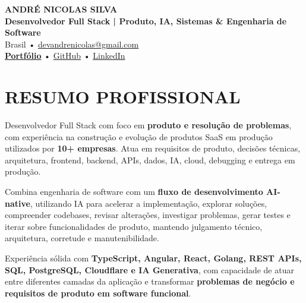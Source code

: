 \documentclass[10pt,a4paper]{article}
\begin{document}

\begin{center}

    {\LARGE \textbf{ANDRÉ NICOLAS SILVA}} \\[-2pt]

    {\normalsize \textbf{Desenvolvedor Full Stack | Produto, IA, Sistemas \& Engenharia de Software}} \\[1pt]

    \footnotesize
    Brasil \quad • \quad
    \href{mailto:devandrenicolas@gmail.com}{devandrenicolas@gmail.com} \\[-1pt]

    \textbf{\href{https://portfolio-andrenicolas.vercel.app}{Portfólio}}
    \quad • \quad
    \href{https://github.com/devAndreNicolas}{GitHub}
    \quad • \quad
    \href{https://www.linkedin.com/in/devandrenicolas}{LinkedIn}

\end{center}

\vspace{-3pt}


\section*{RESUMO PROFISSIONAL}

\footnotesize

Desenvolvedor Full Stack com foco em \textbf{produto e resolução de
problemas}, com experiência na construção e evolução de produtos SaaS
em produção utilizados por \textbf{10+ empresas}. Atua em requisitos
de produto, decisões técnicas, arquitetura, frontend, backend, APIs,
dados, IA, cloud, debugging e entrega em produção.

Combina engenharia de software com um \textbf{fluxo de desenvolvimento
AI-native}, utilizando IA para acelerar a implementação, explorar
soluções, compreender codebases, revisar alterações, investigar
problemas, gerar testes e iterar sobre funcionalidades de produto,
mantendo julgamento técnico, arquitetura, corretude e
manutenibilidade.

Experiência sólida com \textbf{TypeScript, Angular, React, Golang,
REST APIs, SQL, PostgreSQL, Cloudflare e IA Generativa}, com capacidade
de atuar entre diferentes camadas da aplicação e transformar
\textbf{problemas de negócio e requisitos de produto em software
funcional}.
\end{document}

